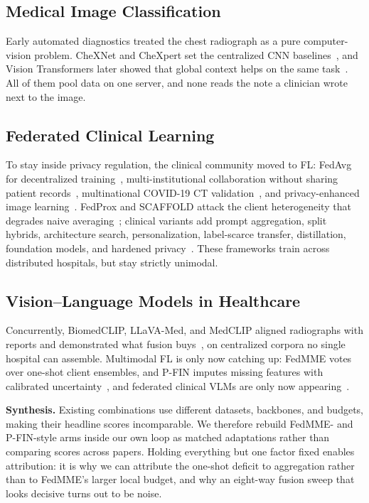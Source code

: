 \documentclass[letterpaper, conference]{IEEEtran}
\begin{document}
\subsection{Medical Image Classification}
Early automated diagnostics treated the chest radiograph as a pure computer-vision
problem. CheXNet and CheXpert set the centralized CNN
baselines~\cite{Rajpurkar2017,Irvin2019}, and Vision Transformers later showed that
global context helps on the same task~\cite{Dosovitskiy2021,Liu2021swin}. All of them
pool data on one server, and none reads the note a clinician wrote next to the image.

\subsection{Federated Clinical Learning}
To stay inside privacy regulation, the clinical community moved to FL: FedAvg for
decentralized training~\cite{McMahan2017}, multi-institutional collaboration without
sharing patient records~\cite{Sheller2020}, multinational COVID-19 CT
validation~\cite{Dou2021}, and privacy-enhanced image learning~\cite{Kaissis2021}.
FedProx and SCAFFOLD attack the client heterogeneity that degrades naive
averaging~\cite{Li2020fedprox,Karimireddy2020}; clinical variants add prompt
aggregation, split hybrids, architecture search, personalization, label-scarce
transfer, distillation, foundation models, and hardened
privacy~\cite{Zhao2025fedlppa,Mao2025fedsplit,Zhang2024fednas,Jiang2025apfl,Wang2024ftl,Li2024globecom,Ahmed2025feddistill,Huang2025globecom,Yang2025fedfm,Dvornek2024review,Zhou2024ppvit,Chen2024globecom,Sun2024globecom}. These frameworks train across
distributed hospitals, but stay strictly unimodal.

\subsection{Vision--Language Models in Healthcare}
Concurrently, BiomedCLIP, LLaVA-Med, and MedCLIP aligned radiographs with reports and
demonstrated what fusion
buys~\cite{Zhang2023biomedclip,Li2023llavamed,Wang2022medclip}, on centralized corpora
no single hospital can assemble. Multimodal FL is only now catching up: FedMME votes
over one-shot client ensembles, and P-FIN imputes missing features with calibrated
uncertainty~\cite{Wang2025fedmme,Shahid2026pfin}, and federated clinical VLMs are
only now appearing~\cite{Yan2024crossmodal,Akkaya2024fedvlm,Zhang2024globecom}.

\textbf{Synthesis.} Existing combinations use different datasets, backbones, and
budgets, making their headline scores incomparable. We therefore rebuild
FedMME- and P-FIN-style arms
inside our own loop as matched adaptations rather than comparing scores across papers.
Holding everything but one factor fixed enables attribution: it is why we can
attribute the one-shot deficit to aggregation rather than to FedMME's larger local
budget, and why an eight-way fusion sweep that looks decisive turns out to be noise.
\end{document}
